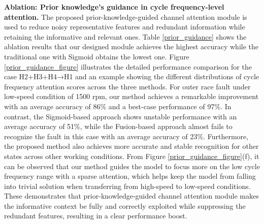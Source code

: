 \documentclass{article}
\begin{document}
	\textbf{Ablation: Prior knowledge's guidance in cycle frequency-level attention.} The proposed prior-knowledge-guided channel attention module is used to reduce noisy representative features and redundant information while retaining the informative and relevant ones. Table \ref{prior_guidance} shows the ablation results that our designed module achieves the highest accuracy while the traditional one with Sigmoid obtains the lowest one. Figure \ref{prior_guidance_figure} illustrates the detailed performance comparison for the case H2+H3+H4→H1 and an example showing the different distributions of cycle frequency attention scores across the three methods. For outer race fault under low-speed condition of 1500 rpm, our method achieves a remarkable improvement with an average accuracy of 86\% and a best-case performance of 97\%. In contrast, the Sigmoid-based approach shows unstable performance with an average accuracy of 51\%, while the Fusion-based approach almost fails to recognize the fault in this case with an average accuracy of 23\%. Furthermore, the proposed method also achieves more accurate and stable recognition for other states across other working conditions. From Figure \ref{prior_guidance_figure}(f), it can be observed that our method guides the model to focus more on the low cycle frequency range with a sparse attention, which helps keep the model from falling into trivial solution when transferring from high-speed to low-speed conditions. These demonstrates that prior-knowledge-guided channel attention module makes the informative context be fully and correctly exploited while suppressing the redundant features, resulting in a clear performance boost.
	
\end{document}
